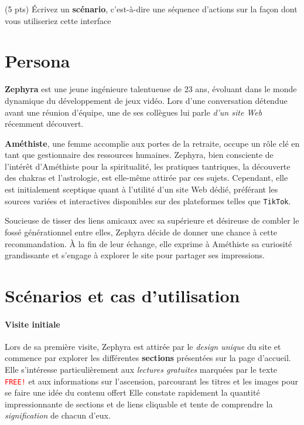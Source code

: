 \documentclass[9pt]{report}
\begin{document}
\begin{multicols*}{2}
  \begin{Exercice}{(5 pts)}{}
    Écrivez un \textbf{scénario}, c’est-à-dire une séquence d’actions sur 
    la façon dont vous utiliseriez cette
    interface
  \end{Exercice}


  \section{Persona}
  \textbf{Zephyra} est une jeune ingénieure talentueuse de 23 ans, 
  évoluant dans le monde dynamique du développement de jeux vidéo. 
  Lors d'une conversation détendue avant une réunion d'équipe, 
une de ses collègues lui parle \textit{d'un site Web} récemment découvert.

  \textbf{Améthiste}, une femme accomplie aux portes de la retraite, 
  occupe un rôle clé en tant que gestionnaire des ressources humaines. 
  Zephyra, bien consciente de l'intérêt d'Améthiste pour la spiritualité, 
  les pratiques tantriques, la découverte des chakras et l'astrologie, 
  est elle-même attirée par ces sujets. Cependant, elle est initialement 
  sceptique quant à l'utilité d'un site Web dédié, préférant les sources 
  variées et interactives disponibles sur des plateformes telles que 
  \texttt{TikTok}.

  Soucieuse de tisser des liens amicaux avec sa supérieure et désireuse 
  de combler le fossé générationnel entre elles, Zephyra décide de donner 
  une chance à cette recommandation. À la fin de leur échange, elle exprime 
  à Améthiste sa curiosité grandissante et s'engage à explorer le site 
  pour partager ses impressions.


  \section{Scénarios et cas d'utilisation} 

  \paragraph{Visite initiale}
  Lors de sa première visite, Zephyra est attirée par le 
  \textit{design unique} du 
  site et commence par explorer les différentes \textbf{sections}
  présentées sur la page d'accueil. Elle s'intéresse particulièrement 
  aux \textit{lectures gratuites} marquées par le texte 
  \textcolor{red}{\texttt{FREE!}} et aux informations sur l'ascension, 
  parcourant les titres et les images pour se faire une idée 
  du contenu offert Elle constate rapidement la quantité impressionnante 
  de sections et de liens cliquable et tente de comprendre 
  la \textit{signification} de chacun d'eux.



\end{multicols*}
\end{document}

